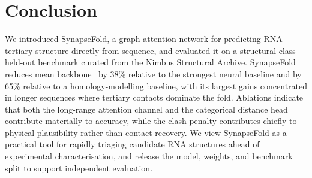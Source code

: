 \section{Conclusion}
\label{sec:conclusion}

We introduced SynapseFold, a graph attention network for predicting RNA tertiary structure directly from sequence, and evaluated it on a structural-class held-out benchmark curated from the Nimbus Structural Archive. SynapseFold reduces mean backbone \rmsd\ by 38\% relative to the strongest neural baseline and by 65\% relative to a homology-modelling baseline, with its largest gains concentrated in longer sequences where tertiary contacts dominate the fold. Ablations indicate that both the long-range attention channel and the categorical distance head contribute materially to accuracy, while the clash penalty contributes chiefly to physical plausibility rather than contact recovery. We view SynapseFold as a practical tool for rapidly triaging candidate RNA structures ahead of experimental characterisation, and release the model, weights, and benchmark split to support independent evaluation.

